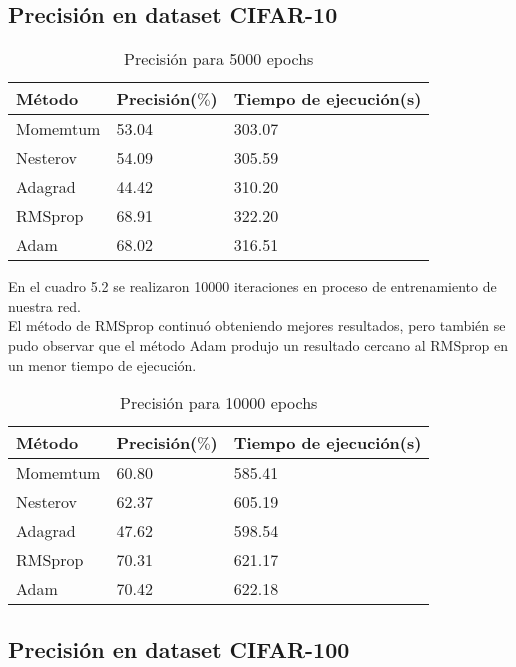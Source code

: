 \subsection{Precisión en dataset CIFAR-10}
\begin{table}[H]
	\centering
	\caption{Precisión para 5000 epochs}
	\label{my-label}
	\begin{centering}
	\begin{tabular}{@{}lll@{}}
		\toprule
		Método& Precisión($\%$)&  Tiempo de ejecución(s)  \\ \midrule
		Momemtum& 53.04  & 303.07 \\
		Nesterov& 54.09  &  305.59\\
		Adagrad& 44.42 &  310.20 \\
		RMSprop& 68.91 & 322.20 \\
		Adam& 68.02  & 316.51 \\ \bottomrule
	\end{tabular}
	\end{centering}

\end{table}
En el cuadro 5.2 se realizaron 10000 iteraciones en proceso de entrenamiento de nuestra red.\\ El método de RMSprop continuó obteniendo mejores resultados, pero también se pudo observar que el método Adam produjo un resultado cercano al RMSprop en un menor tiempo de ejecución.
\begin{table}[H]
	\centering
	\caption{Precisión para 10000 epochs}
	\label{my-label}
	\begin{centering}
		\begin{tabular}{@{}lll@{}}
			\toprule
			Método& Precisión($\%$)&  Tiempo de ejecución(s)  \\ \midrule
			Momemtum& 60.80  & 585.41\\
			Nesterov& 62.37 &  605.19\\
			Adagrad&47.62  &  598.54 \\
			RMSprop& 70.31 &  621.17\\
			Adam& 70.42 & 622.18 \\ \bottomrule
		\end{tabular}
	\end{centering}
	
\end{table}

\subsection{Precisión en dataset CIFAR-100}

